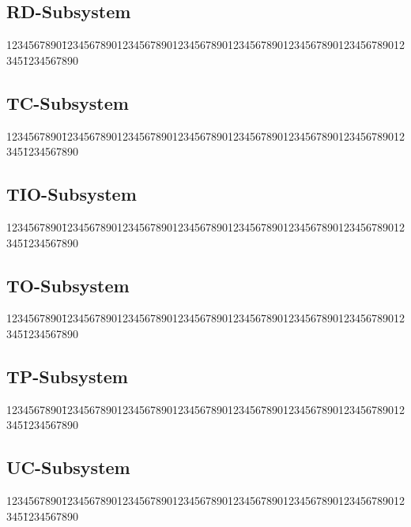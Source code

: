 \subsection{RD-Subsystem}
 
{\small
\begin{tabbing}
1234567890\=12345678901234567890123456789012345678901234567890123456789012345\=1234567890 \kill
 

 
\end{tabbing}
}

\subsection{TC-Subsystem}
 
{\small
\begin{tabbing}
1234567890\=12345678901234567890123456789012345678901234567890123456789012345\=1234567890 \kill
 

 
\end{tabbing}
}

\subsection{TIO-Subsystem}
 
{\small
\begin{tabbing}
1234567890\=12345678901234567890123456789012345678901234567890123456789012345\=1234567890 \kill
 

 
\end{tabbing}
}

\subsection{TO-Subsystem}
 
{\small
\begin{tabbing}
1234567890\=12345678901234567890123456789012345678901234567890123456789012345\=1234567890 \kill
 

 
\end{tabbing}
}

\subsection{TP-Subsystem}
 
{\small
\begin{tabbing}
1234567890\=12345678901234567890123456789012345678901234567890123456789012345\=1234567890 \kill
 

 
\end{tabbing}
}

\subsection{UC-Subsystem}
 
{\small
\begin{tabbing}
1234567890\=12345678901234567890123456789012345678901234567890123456789012345\=1234567890 \kill
 

 
\end{tabbing}
}